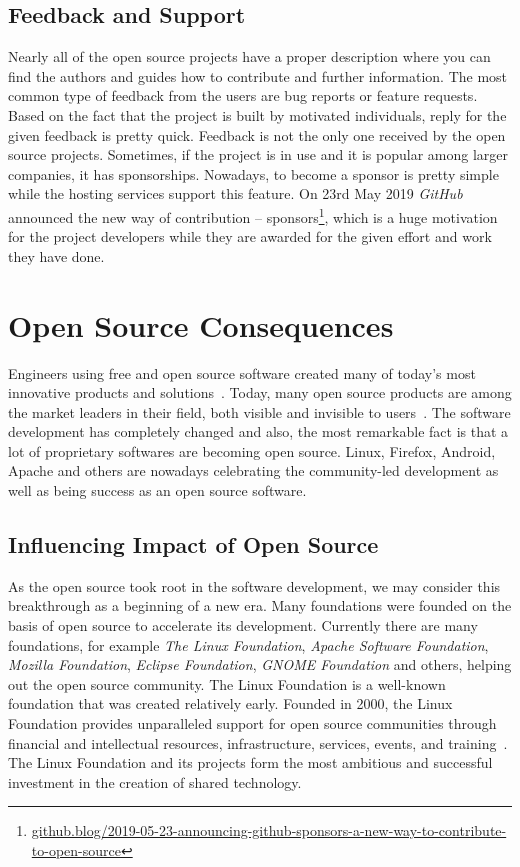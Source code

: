 \documentclass[12pt,a4paper]{article}
\theoremstyle{definition}
\begin{document}
    \subsection{Feedback and Support}

    Nearly all of the open source projects have a proper description where you can find the authors and guides how to contribute and further information. The most common type of feedback from the users are bug reports or feature requests. Based on the fact that the project is built by motivated individuals, reply for the given feedback is pretty quick. Feedback is not the only one received by the open source projects. Sometimes, if the project is in use and it is popular among larger companies, it has sponsorships. Nowadays, to become a sponsor is pretty simple while the hosting services support this feature. On 23rd May 2019 \textit{GitHub} announced the new way of contribution -- sponsors\footnote{\href{https://github.blog/2019-05-23-announcing-github-sponsors-a-new-way-to-contribute-to-open-source/}{github.blog/2019-05-23-announcing-github-sponsors-a-new-way-to-contribute-to-open-source}}, which is a huge motivation for the project developers while they are awarded for the given effort and work they have done.

\section{Open Source Consequences}

    Engineers using free and open source software created many of today's most innovative products and solutions~\cite{4163037}. Today, many open source products are among the market leaders in their field, both visible and invisible to users~\cite{7217776}. The software development has completely changed and also, the most remarkable fact is that a lot of proprietary softwares are becoming open source. Linux, Firefox, Android, Apache and others are nowadays celebrating the community-led development as well as being success as an open source software.

    \subsection{Influencing Impact of Open Source}

    As the open source took root in the software development, we may consider this breakthrough as a beginning of a new era. Many foundations were founded on the basis of open source to accelerate its development. Currently there are many foundations, for example \textit{The Linux Foundation}, \textit{Apache Software Foundation}, \textit{Mozilla Foundation}, \textit{Eclipse Foundation}, \textit{GNOME Foundation} and others, helping out the open source community. The Linux Foundation is a well-known foundation that was created relatively early. Founded in 2000, the Linux Foundation provides unparalleled support for open source communities through financial and intellectual resources, infrastructure, services, events, and training~\cite{TLF-about}. The Linux Foundation and its projects form the most ambitious and successful investment in the creation of shared technology\cite{TLF-about}.\\
\end{document}
